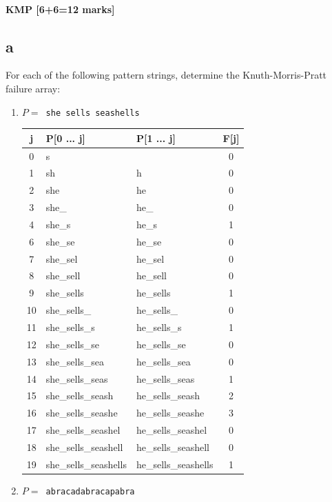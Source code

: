 \documentclass[12pt]{article}
\begin{document}
\subsection{KMP [6+6=12 marks]}
\begin{itemize}
\part{a} For each of the following pattern strings, determine the Knuth-Morris-Pratt
failure array:
\begin{enumerate}
\item $P = ${\tt~she sells seashells}
\begin{center}
  \begin{tabular}{c|l|l|c}
    \hline
    \textbf{j} & \textbf{P[0 ... j]} & \textbf{P[1 ... j]} & \textbf{F[j]}\\
    \hline
    0 & s &  &  0\\
    1 & sh & h & 0 \\
    2 & she & he & 0 \\
    3 & she\_ & he\_ & 0  \\
    4 & she\_s & he\_s & 1  \\
    6 & she\_se & he\_se & 0 \\
    7 & she\_sel & he\_sel & 0 \\
    8 & she\_sell & he\_sell & 0 \\
    9 & she\_sells & he\_sells & 1 \\
    10 & she\_sells\_ & he\_sells\_ & 0 \\
    11 & she\_sells\_s & he\_sells\_s & 1 \\
    12 & she\_sells\_se & he\_sells\_se & 0 \\
    13 & she\_sells\_sea & he\_sells\_sea & 0 \\
    14 & she\_sells\_seas & he\_sells\_seas & 1 \\
    15 & she\_sells\_seash & he\_sells\_seash & 2 \\
    16 & she\_sells\_seashe & he\_sells\_seashe & 3 \\
    17 & she\_sells\_seashel & he\_sells\_seashel & 0 \\
    18 & she\_sells\_seashell & he\_sells\_seashell & 0 \\
    19 & she\_sells\_seashells & he\_sells\_seashells & 1
  \end{tabular}
\end{center}
\item $P = ${\tt~abracadabracapabra}
\begin{center}

\end{center}
\end{enumerate}
\end{itemize}
\end{document}
